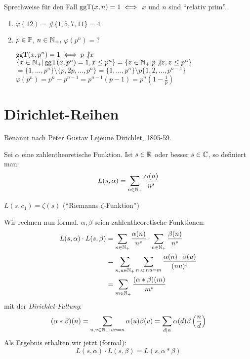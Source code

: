 \documentclass[a4paper,DIV15,BCOR12mm]{article}
\begin{document}
Sprechweise für den Fall $\mathop{\rm ggT}\nolimits(x,n) = 1 \iff$ $x$ und $n$ sind
"`relativ prim"'.

\begin{beispiel}
\begin{enumerate}
\item $\varphi(12) = \#\{1,5,7,11\} = 4$
\item $p\in\mathbb{P}$, $n\in\mathbb{N}_+,$ $\varphi(p^n) = ?$

$\mathop{\rm ggT}\nolimits(x,p^n) = 1 \iff p\not|x$\\
$\{x\in\mathbb{N}_+|\mathop{\rm ggT}\nolimits(x,p^n) = 1 , x \le p^n\} = \{x\in\mathbb{N}_+| p \not| x, x \le p^n\}$\\
$= \{1,\ldots,p^n\} \setminus \{p,2p,\ldots,p^n\} = \{1,\ldots,p^n\}\setminus p \{1,2,\ldots,p^{n-1}\}$\\
$\varphi(p^n) = p^n-p^{n-1} = p^{n-1}(p-1) = p^n(1-\frac 1 p )$

\end{enumerate}
\end{beispiel}


\section{Dirichlet-Reihen}
Benannt nach Peter Gustav Lejeune Dirichlet, 1805-59.

\begin{definition}
Sei $\alpha$ eine zahlentheoretische Funktion. Ist $s\in\mathbb{R}$ oder
besser $s\in\mathbb{C}$, so definiert man:
\[ L(s,\alpha) = \sum_{n\in\mathbb{N}_+} \frac{\alpha(n)}{n^s} \]
\end{definition}

\begin{beispiel}
$L(s,c_1) = \zeta(s)$ ("`Riemanns $\zeta$-Funktion"')
\end{beispiel}

Wir rechnen nun formal. $\alpha,\beta$ seien zahlentheoretische
Funktionen:
\begin{align*}
L(s,\alpha)\cdot L(s,\beta) &= \sum_{n\in\mathbb{N}_+} \frac{\alpha(n)}{n^s} \cdot \sum_{n\in\mathbb{N}_+} \frac{\beta(n)}{n^s} \\
&=  \sum_{n,u\in\mathbb{N}_+} \sum_{n,u; nu=m} \frac{\alpha(n) \cdot \beta(u)}{(nu)^s} \\
&= \sum_{m\in\mathbb{N}_+} \frac{(\alpha * \beta)(m)}{m^s}
\end{align*}
mit der \emph{Dirichlet-Faltung}: \[ (\alpha * \beta)(n) =
\sum_{u,v\in\mathbb{N}_+; uv=n} \alpha(u) \beta(v) = \sum_{d|n} \alpha(d)
\beta \left(\frac n d\right) \] Als Ergebnis erhalten wir jetzt
(formal):
\[ L(s,\alpha)\cdot L(s,\beta) = L(s,\alpha * \beta) \]
\end{document}
